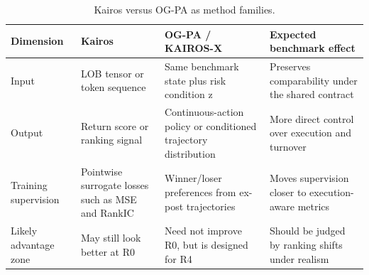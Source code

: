 \begin{table}[t]
\centering
\caption{Kairos versus OG-PA as method families.}
\label{tab:table_31_kairos_vs_ogpa}
\begin{tabular}{llll}
\toprule
Dimension & Kairos & OG-PA / KAIROS-X & Expected benchmark effect \\
\midrule
Input & LOB tensor or token sequence & Same benchmark state plus risk condition z & Preserves comparability under the shared contract \\
Output & Return score or ranking signal & Continuous-action policy or conditioned trajectory distribution & More direct control over execution and turnover \\
Training supervision & Pointwise surrogate losses such as MSE and RankIC & Winner/loser preferences from ex-post trajectories & Moves supervision closer to execution-aware metrics \\
Likely advantage zone & May still look better at R0 & Need not improve R0, but is designed for R4 & Should be judged by ranking shifts under realism \\
\bottomrule
\end{tabular}
\end{table}
